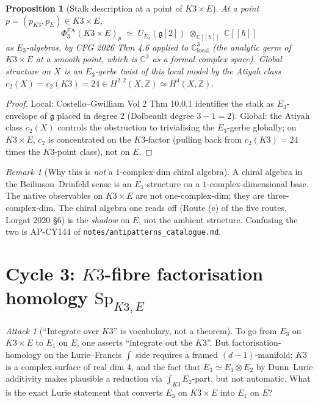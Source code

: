\documentclass[11pt]{amsart}
\providecommand{\C}{\mathbb{C}}
\providecommand{\Z}{\mathbb{Z}}
\providecommand{\g}{\mathfrak{g}}
\providecommand{\Eone}{E_{1}}
\providecommand{\Etwo}{E_{2}}
\providecommand{\PhiFA}{\Phi^{\mathrm{FA}}}
\providecommand{\SpF}{\mathrm{Sp}}
\theoremstyle{plain}
\newtheorem{proposition}[theorem]{Proposition}
\theoremstyle{definition}
\theoremstyle{remark}
\newtheorem{remark}[theorem]{Remark}
\newtheorem{attack}[theorem]{Attack}
\begin{document}
\begin{proposition}[Stalk description at a point of $K3\times E$]
\label{prop:stalk-K3E}
At a point $p = (p_{K3}, p_{E}) \in K3\times E$,
\[
\PhiFA_{3}(K3\times E)_{p} \;\simeq\; U_{E_{3}}(\g[2])
\;\otimes_{\C[\![\hbar]\!]}\; \C[\![\hbar]\!]
\]
as $E_{3}$-algebras, by CFG 2026 Thm 4.6 applied to $\C^{3}_{\mathrm{local}}$
(the analytic germ of $K3\times E$ at a smooth point, which is
$\C^{3}$ as a formal complex space). Global structure on $X$ is an
$E_{3}$-gerbe twist of this local model by the Atiyah class
$c_{2}(X) = c_{2}(K3) = 24 \in H^{2,2}(X,\Z) \simeq H^{4}(X,\Z)$.
\end{proposition}

\begin{proof}
Local: Costello--Gwilliam Vol 2 Thm 10.0.1 identifies the stalk as
$E_{3}$-envelope of $\g$ placed in degree $2$ (Dolbeault degree
$3-1=2$). Global: the Atiyah class $c_{2}(X)$ controls the obstruction
to trivialising the $E_{3}$-gerbe globally; on $K3\times E$, $c_{2}$
is concentrated on the $K3$-factor (pulling back from $c_{2}(K3)=24$
times the $K3$-point class), not on $E$.
\end{proof}

\begin{remark}[Why this is \emph{not} a $1$-complex-dim chiral algebra]
\label{rem:not-chiral-ambient}
A chiral algebra in the Beilinson--Drinfeld sense is an $E_{1}$-structure
on a $1$-complex-dimensional base. The native observables on $K3\times
E$ are not one-complex-dim; they are three-complex-dim. The chiral
algebra one reads off (Route (c) of the five routes, Lorgat 2020 \S6)
is the \emph{shadow} on $E$, not the ambient structure. Confusing the
two is AP-CY144 of
\texttt{notes/antipatterns\_catalogue.md}.
\end{remark}

\section{Cycle 3: $K3$-fibre factorisation homology $\SpF_{K3,E}$}

\begin{attack}[``Integrate over $K3$'' is vocabulary, not a theorem]
\label{atk:3}
To go from $E_{3}$ on $K3\times E$ to $E_{1}$ on $E$, one asserts
``integrate out the $K3$''. But factorisation-homology on the
Lurie--Francis $\int$ side requires a framed $(d-1)$-manifold; $K3$ is
a complex surface of real dim $4$, and the fact that
$E_{3}\simeq \Eone\otimes \Etwo$ by Dunn--Lurie additivity makes
plausible a reduction via $\int_{K3} \Etwo$-part, but not automatic.
What is the exact Lurie statement that converts $E_{3}$ on
$K3\times E$ into $\Eone$ on $E$?
\end{attack}
\end{document}
